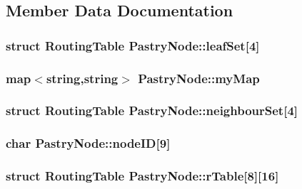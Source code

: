 \subsection{Member Data Documentation}
\hypertarget{structPastryNode_aa529c7f78df5bb37013eeb96a2f4f83d}{
\subsubsection[{leaf\-Set}]{\setlength{\rightskip}{0pt plus 5cm}struct {\bf Routing\-Table} Pastry\-Node\-::leaf\-Set\mbox{[}4\mbox{]}}}\label{structPastryNode_aa529c7f78df5bb37013eeb96a2f4f83d}
\hypertarget{structPastryNode_ac6fc5a45aefb40f056954664d4820423}{
\subsubsection[{my\-Map}]{\setlength{\rightskip}{0pt plus 5cm}map$<$string,string$>$ Pastry\-Node\-::my\-Map}}\label{structPastryNode_ac6fc5a45aefb40f056954664d4820423}
\hypertarget{structPastryNode_a89eba401351ef59d5892a47416b7b874}{
\subsubsection[{neighbour\-Set}]{\setlength{\rightskip}{0pt plus 5cm}struct {\bf Routing\-Table} Pastry\-Node\-::neighbour\-Set\mbox{[}4\mbox{]}}}\label{structPastryNode_a89eba401351ef59d5892a47416b7b874}
\hypertarget{structPastryNode_a2d2056d1f2b89b7369d1b96a38c6a5ae}{
\subsubsection[{node\-I\-D}]{\setlength{\rightskip}{0pt plus 5cm}char Pastry\-Node\-::node\-I\-D\mbox{[}9\mbox{]}}}\label{structPastryNode_a2d2056d1f2b89b7369d1b96a38c6a5ae}
\hypertarget{structPastryNode_a6092d47e197f9df34a0b29613cd2a053}{
\subsubsection[{r\-Table}]{\setlength{\rightskip}{0pt plus 5cm}struct {\bf Routing\-Table} Pastry\-Node\-::r\-Table\mbox{[}8\mbox{]}\mbox{[}16\mbox{]}}}\label{structPastryNode_a6092d47e197f9df34a0b29613cd2a053}
